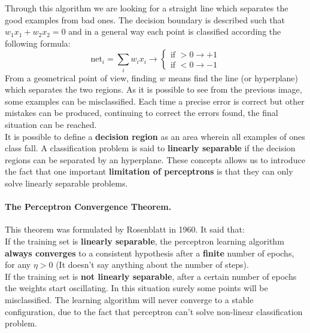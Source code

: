 Through this algorithm we are looking for a straight line which separates the good examples from bad ones. The decision boundary is described such that $w_1x_1 + w_2x_2 = 0$ and in a general way each point is classified according the following formula:
$$\text{net}_i = \sum_i w_ix_i \rightarrow \begin{cases}
\text{if } >0 \rightarrow +1\\
\text{if } <0 \rightarrow -1
\end{cases}$$
From a geometrical point of view, finding $w$ means find the line (or hyperplane) which separates the two regions.
As it is possible to see from the previous image, some examples can be misclassified. Each time a precise error is correct but other mistakes can be produced, continuing to correct the errors found, the final situation can be reached.\\
It is possible to define a \textbf{decision region} as an area wherein all examples of ones class fall. A classification problem is said to \textbf{linearly separable} if the decision regions can be separated by an hyperplane. These concepts allows us to introduce the fact that one important \textbf{limitation of perceptrons} is that they can only solve linearly separable problems.

\paragraph*{The Perceptron Convergence Theorem.} This theorem was formulated by Rosenblatt in 1960. It said that:\\
If the training set is \textbf{linearly separable}, the perceptron learning algorithm \textbf{always converges} to a consistent hypothesis after a \textbf{finite} number of epochs, for any $\eta > 0$ (It doesn't say anything about the number of steps).\\
If the training set is \textbf{not linearly separable}, after a certain number of epochs the weights start oscillating. In this situation surely some points will be misclassified. The learning algorithm will never converge to a stable configuration, due to the fact that perceptron can't solve non-linear classification problem.

\par \bigskip \noindent
